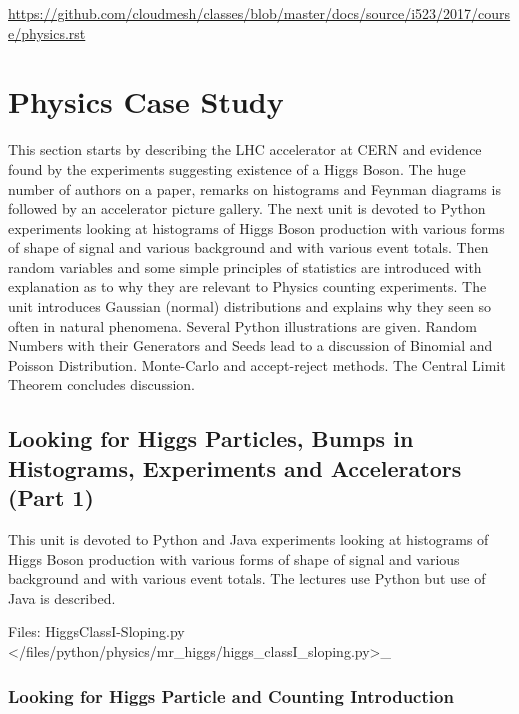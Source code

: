 \begin{fileremark}\url{https://github.com/cloudmesh/classes/blob/master/docs/source/i523/2017/course/physics.rst}\end{fileremark}
\section{Physics Case Study}\label{physics-case-study}

This section starts by describing the LHC accelerator at CERN and
evidence found by the experiments suggesting existence of a Higgs Boson.
The huge number of authors on a paper, remarks on histograms and Feynman
diagrams is followed by an accelerator picture gallery. The next unit is
devoted to Python experiments looking at histograms of Higgs Boson
production with various forms of shape of signal and various background
and with various event totals. Then random variables and some simple
principles of statistics are introduced with explanation as to why they
are relevant to Physics counting experiments. The unit introduces
Gaussian (normal) distributions and explains why they seen so often in
natural phenomena. Several Python illustrations are given. Random
Numbers with their Generators and Seeds lead to a discussion of Binomial
and Poisson Distribution. Monte-Carlo and accept-reject methods. The
Central Limit Theorem concludes discussion.

\subsection{Looking for Higgs Particles, Bumps in Histograms,
Experiments and Accelerators (Part
1)}\label{looking-for-higgs-particles-bumps-in-histograms-experiments-and-accelerators-part-1}

This unit is devoted to Python and Java experiments looking at
histograms of Higgs Boson production with various forms of shape of
signal and various background and with various event totals. The
lectures use Python but use of Java is described.


Files:
HiggsClassI-Sloping.py \textless{}/files/python/physics/mr\_higgs/higgs\_classI\_sloping.py\textgreater{}\_

\subsubsection{Looking for Higgs Particle and Counting
Introduction}\label{looking-for-higgs-particle-and-counting-introduction}

